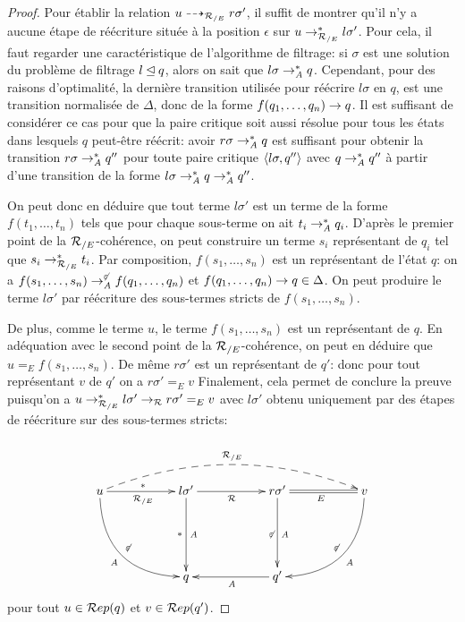 \begin{proof}
  Pour établir la relation $u \dashrightarrow_{\mathcal R_{/E}} r\sigma'$, il
  suffit de montrer qu'il n'y a aucune étape de réécriture située à la
  position $\epsilon$ sur $u \rightarrow_{\mathcal R_{/E}}^* l\sigma'$.  Pour cela, il faut
  regarder une caractéristique de l'algorithme de filtrage: si
  $\sigma$ est une solution du problème de filtrage $l \unlhd q$,
  alors on sait que $l\sigma \rightarrow_\mathit A^* q$.  Cependant, pour des raisons
  d'optimalité, la dernière transition utilisée pour réécrire
  $l\sigma$ en $q$, est une transition normalisée de $\Delta$, donc de
  la forme $f(q_1,\dots, q_n) \rightarrow q$.  Il est suffisant de considérer
  ce cas pour que la paire critique soit aussi résolue pour tous les
  états dans lesquels $q$ peut-être réécrit: avoir $r\sigma \rightarrow_\mathit A^*
  q$ est suffisant pour obtenir la transition $r\sigma \rightarrow_{\mathit A}^* q''$
  pour toute paire critique $\langle l\sigma, q'' \rangle$ avec $q \rightarrow_{\mathit A}^*
  q''$ à partir d'une transition de la forme $l\sigma \rightarrow^*_{\mathit A} q
  \rightarrow^*_\mathit A q''$.
  
  On peut donc en déduire que tout terme $l\sigma'$ est un terme de la forme $f(t_1, \dots, t_n)$ tels que 
  pour chaque sous-terme on ait $t_i \rightarrow_\mathit A^* q_i$. D'après le premier point de la ${\mathcal R_{/E}}$-cohérence,
  on peut construire un terme $s_i$ représentant de $q_i$ tel que $s_i \rightarrow_{\mathcal R_{/E}}^* t_i$. 
  Par composition, $f(s_1, \dots, s_n)$ est un représentant de l'état $q$:
  on a $ f(s_1,\dots, s_n) \rightarrow^{\not\varepsilon}_\mathit A f(q_1,\dots, q_n)$ et $f(q_1,\dots, q_n) \rightarrow q \in \Delta$.
  On peut produire le terme $l\sigma'$ par réécriture des sous-termes stricts de $f(s_1, \dots, s_n)$.

  De plus, comme le terme $u$, le terme $f(s_1, \dots, s_n)$ est un représentant de $q$. En adéquation
  avec le second point de la ${\mathcal R_{/E}}$-cohérence, on peut en déduire que $u =_E f(s_1, \dots, s_n)$.
  De même $r\sigma'$ est un représentant de $q'$: donc pour tout représentant $v$ de $q'$ on a $r\sigma' =_E v$
  Finalement, cela permet de conclure la preuve puisqu'on a $u \rightarrow_{\mathcal R_{/E}}^* l\sigma' \rightarrow_\mathcal R r\sigma' =_E v$
  avec $l\sigma'$ obtenu uniquement par des étapes de réécriture sur des sous-termes stricts:

  \[
  \xymatrix{
    &&&&&\\
    u \ar@/_2pc/[rrdd]^{\not\varepsilon}_{\A} \ar[rr]_{\RE}^{*} \ar @/^1.8pc/ @{-->} [rrrrrr]^{\RE} &&
    l\sigma' \ar[dd]^{\A}_{*} \ar[rr]_{\R}&&
    r\sigma' \ar[dd]^{\A}_{\not\varepsilon} && v \ar@{=}[ll]^{E} \ar@/^2pc/[lldd]_{\not\varepsilon}^{\A}\\
    &&&&&\\
    && q && q' \ar[ll]^{\A} &
  }
  \]
  \noindent
  pour tout $u \in \mathcal R ep(q)$ et $v \in \mathcal R ep(q')$.
\end{proof}


